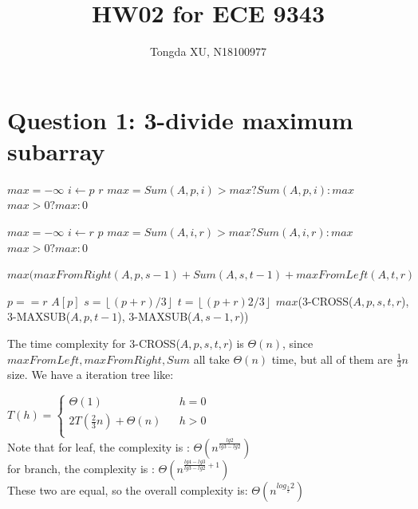 \documentclass[]{article}
\title{HW02 for ECE 9343}
\author{Tongda XU, N18100977}
\begin{document}
\maketitle

\section{Question 1: 3-divide maximum subarray}

\begin{codebox}
	\li $max = -\infty$
	\li \For $i \gets p$ \To $r$
	\li		\Do $max = Sum(A,p,i)>max?Sum(A,p,i):max$
 		\End
	\li \Return $max > 0 ? max : 0$
\end{codebox}

\begin{codebox}
	\li $max = -\infty$
	\li \For $i \gets r$ \Downto $p$
	\li		\Do $max = Sum(A,i,r)>max?Sum(A,i,r):max$
	\End
	\li \Return $max > 0 ? max : 0$
\end{codebox}

\begin{codebox}
	\li \Return $max(maxFromRight(A, p, s-1) +  Sum(A,s,t-1) + maxFromLeft(A, t, r)$
\end{codebox}

\begin{codebox}
	\li \If $p == r$
	\li \Then \Return $A[p]$
	\End
	\li $s = \left \lfloor (p+r)/3 \right \rfloor$
	\li $t = \left \lfloor (p+r)2/3 \right \rfloor$
	\li \Return $max$(3-CROSS($A, p, s, t, r$), 3-MAXSUB($A, p, t-1$), 3-MAXSUB($A, s-1, r$))
\end{codebox}

The time complexity for 3-CROSS($A, p, s, t, r$) is $\Theta(n)$, since $maxFromLeft, maxFromRight, Sum$ all take $\Theta(n)$ time, but all of them are $\frac{1}{3}n$ size. We have a iteration tree like: 

$ T(h)=\left\{
\begin{array}{lcl}
\Theta(1)       &      & {h = 0}\\
2T(\frac{2}{3}n) + \Theta(n)     &      & {h > 0}\\
\end{array} \right. $\\

Note that for leaf, the complexity is : $\Theta(n^{\frac{lg2}{lg3-lg2}})$\\
for branch, the complexity is : $\Theta(n^{\frac{lg4-lg3}{lg3-lg2}+1})$\\
These two are equal, so the overall complexity is: $\Theta(n^{log_{\frac{3}{2}}2 })$
\end{document}
